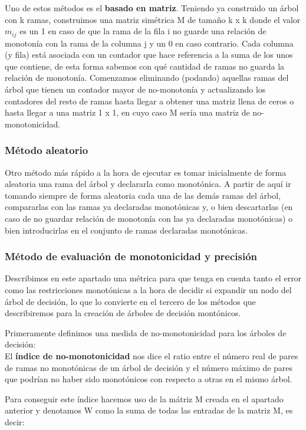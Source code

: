 Uno de estos métodos es el \textbf{basado en matriz}. Teniendo ya construido un árbol con k ramas, construimos una matriz simétrica M de tamaño k x k donde el valor $m_{ij}$ es un 1 en caso de que la rama de la fila i no guarde una relación de monotonía con la rama de la columna j y un 0 en caso contrario. Cada columna (y fila) está asociada con un contador que hace referencia a la suma de los unos que contiene, de esta forma sabemos con qué cantidad de ramas no guarda la relación de monotonía. Comenzamos eliminando (podando) aquellas ramas del árbol que tienen un contador mayor de no-monotonía y actualizando los contadores del resto de ramas hasta llegar a obtener una matriz llena de ceros o hasta llegar a una matriz 1 x 1, en cuyo caso M sería una matriz de no-monotonicidad.

\subsubsection{Método aleatorio}

Otro método más rápido a la hora de ejecutar es tomar inicialmente de forma aleatoria una rama del árbol y declararla como monotónica. A partir de aquí ir tomando siempre de forma aleatoria cada una de las demás ramas del árbol, compararlas con las ramas ya declaradas monotónicas y, o bien descartarlas (en caso de no guardar relación de monotonía con las ya declaradas monotónicas) o bien introducirlas en el conjunto de ramas declaradas monotónicas.

\subsubsection{Método de evaluación de monotonicidad y precisión}

Describimos en este apartado una métrica para que tenga en cuenta tanto el error como las restricciones monotónicas a la hora de decidir si expandir un nodo del árbol de decisión, lo que lo convierte en el tercero de los métodos que describiremos para la creación de árboles de decisión montónicos.

Primeramente definimos una medida de no-monotonicidad para los árboles de decisión:\\
El \textbf{índice de no-monotonicidad} nos dice el ratio entre el número real de pares de ramas no monotónicas de un árbol de decisión y el número máximo de pares que podrían no haber sido monotónicos con respecto a otras en el mismo árbol.

Para conseguir este índice hacemos uso de la mátriz M creada en el apartado anterior y denotamos W como la suma de todas las entradas de la matriz M, es decir:

